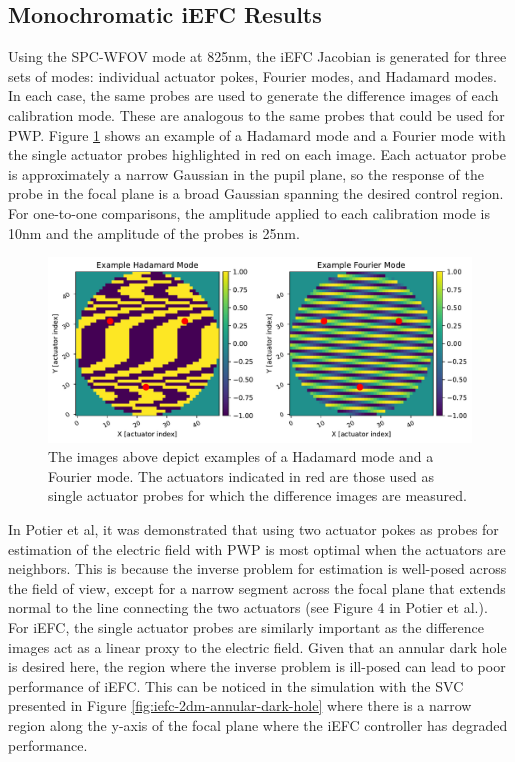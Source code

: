 \documentclass[12pt]{spieman}  %
\begin{document}
\begin{spacing}{2}
\section{Monochromatic iEFC Results}
\label{sec:mono-iefc}
Using the SPC-WFOV mode at 825nm, the iEFC Jacobian is generated for three sets of modes: individual actuator pokes, Fourier modes, and Hadamard modes. In each case, the same probes are used to generate the difference images of each calibration mode. These are analogous to the same probes that could be used for PWP. Figure \ref{fig:example-modes} shows an example of a Hadamard mode and a Fourier mode with the single actuator probes highlighted in red on each image. Each actuator probe is approximately a narrow Gaussian in the pupil plane, so the response of the probe in the focal plane is a broad Gaussian spanning the desired control region. For one-to-one comparisons, the amplitude applied to each calibration mode is 10nm and the amplitude of the probes is 25nm. 

\begin{figure}[h]
    \centering
    \includegraphics[scale=0.6]{figs-general/example_modes.pdf}
    \caption{The images above depict examples of a Hadamard mode and a Fourier mode. The actuators indicated in red are those used as single actuator probes for which the difference images are measured.}
    \label{fig:example-modes}
\end{figure}

In Potier et al\cite{potier-comparing-fpwfs}, it was demonstrated that using two actuator pokes as probes for estimation of the electric field with PWP is most optimal when the actuators are neighbors. This is because the inverse problem for estimation is well-posed across the field of view, except for a narrow segment across the focal plane that extends normal to the line connecting the two actuators (see Figure 4 in Potier et al.\cite{potier-comparing-fpwfs}). For iEFC, the single actuator probes are similarly important as the difference images act as a linear proxy to the electric field. Given that an annular dark hole is desired here, the region where the inverse problem is ill-posed can lead to poor performance of iEFC. This can be noticed in the simulation with the SVC presented in Figure \ref{fig:iefc-2dm-annular-dark-hole} where there is a narrow region along the y-axis of the focal plane where the iEFC controller has degraded performance.


\end{spacing}
\end{document}
